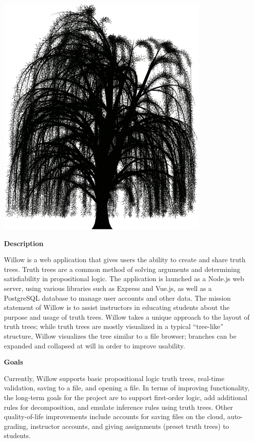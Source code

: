 \documentclass{article}
\begin{document}
\begin{center}
  \includegraphics[scale=0.1]{img/logo.png}
  
  
\end{center}

\begin{center}
  \textbf{Description}
\end{center}
\vspace{-10pt}
\noindent Willow is a web application that gives users the ability to create and share truth trees.
Truth trees are a common method of solving arguments and determining satisfiability in propositional logic.
The application is launched as a Node.js web server, using various libraries such as Express and Vue.js, as well as a PostgreSQL database to manage user accounts and other data.
The mission statement of Willow is to assist instructors in educating students about the purpose and usage of truth trees.
Willow takes a unique approach to the layout of truth trees; while truth trees are mostly visualized in a typical ``tree-like'' structure, Willow visualizes the tree similar to a file browser; branches can be expanded and collapsed at will in order to improve usability.

\begin{center}
  \textbf{Goals}
\end{center}
\vspace{-10pt}
\noindent Currently, Willow supports basic propositional logic truth trees, real-time validation, saving to a file, and opening a file.
In terms of improving functionality, the long-term goals for the project are to support first-order logic, add additional rules for decomposition, and emulate inference rules using truth trees.
Other quality-of-life improvements include accounts for saving files on the cloud, auto-grading, instructor accounts, and giving assignments (preset truth trees) to students.
\end{document}
